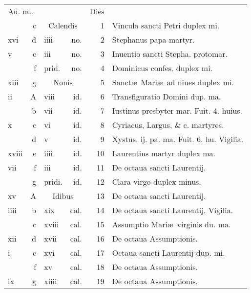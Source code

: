 \documentclass[a5paper,10pt]{book}
\begin{document}
\begin{center}
\begin{tabular}{l r l r r l}
\multicolumn{2}{l}{\color{red}Au. nu.} & & & \color{red} Dies & \\
 & c & \multicolumn{2}{c}{\color{red} Calendis} & 1 & \color{red} Vincula sancti Petri duplex mi. \color{black} \\
xvi & d & iiii & no. & 2 & Stephanus papa martyr. \color{black} \\
v & e & iii & no. & 3 & \color{red} Inuentio sancti Stepha. protomar. \color{black} \\
 & f & \color{red} prid. & no. & 4 & Dominicus confes. duplex mi. \color{black} \\%
xiii & g & \multicolumn{2}{c}{\color{red} Nonis} & 5 & Sanct\ae \ Mari\ae \ ad niues duplex mi. \color{black} \\
ii & \color{red} A & viii & id. & 6 & \color{red} Transfiguratio Domini dup. ma. \color{black} \\
 & b & vii & id. & 7 & Iustinus presbyter mar. \color{red} Fuit. 4. huius. \color{black} \\
x & c & vi & id. & 8 & Cyriacus, Largus, \& c. martyres. \\
 & d & v & id. & 9 & Xystus. ij. pa. ma. \color{red} Fuit. 6. hu. Vigilia. \color{black} \\
xviii & e & iiii & id. & 10 & \color{red} Laurentius martyr duplex ma. \color{black} \\
vii & f & iii & id. & 11 & De octaua sancti Laurentij. \color{black} \\
 & g & \color{red} pridi. & id. & 12 & Clara virgo duplex minus. \color{black} \\
xv & \color{red} A & \multicolumn{2}{c}{\color{red} Idibus} & 13 & De octaua sancti Laurentij. \\
iiii & b & xix & cal. & 14 & De octaua sancti Laurentij. \color{red} Vigilia. \color{black} \\%
 & c & xviii & cal. & 15 & \color{red} Assumptio Mari\ae \ virginis du. ma. \color{black} \\
xii & d & xvii & cal. & 16 & De octaua Assumptionis. \\
i & e & xvi & cal. & 17 & Octaua sancti Laurentij dup. mi. \\
 & f & xv & cal. & 18 & De octaua Assumptionis. \\
ix & g & xiiii & cal. & 19 & De octaua Assumptionis. \color{black} \\

\end{tabular}
\end{center}
\end{document}
